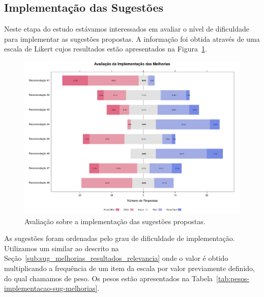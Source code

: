 \subsection{Implementação das Sugestões}
\label{sub:sug_melhorias_resultados_implementacao}

Neste etapa do estudo estávamos interessados em avaliar o nível de dificuldade
para implementar as sugestões propostas. A informação foi obtida através de uma
escala de Likert cujos resultados estão apresentados na
Figura~\ref{fig:plot_likert_avaliacao_implementacao_melhorias}.

\begin{figure}[htpb]
    \centering
    \includegraphics[width=1.1\linewidth]{chapter-sugestoes-melhorias-fgrm/img/plot_likert_avaliacao_implementacao_melhorias.pdf}
    \caption{Avaliação sobre a  implementação das sugestões propostas.}
\label{fig:plot_likert_avaliacao_implementacao_melhorias}
\end{figure}

As sugestões foram ordenadas pelo grau de dificuldade de implementação.
Utilizamos um similar ao descrito na
Seção~\ref{sub:sug_melhorias_resultados_relevancia} onde o valor é obtido
multiplicando a frequência de um item da escala por valor previamente definido,
do qual chamamos de peso. Os pesos estão apresentados na
Tabela~\ref{tab:pesos-implementacao-sug-melhorias}.

\begin{table}[htpb]
\centering
{}
\caption{Pesos utilizados no ranqueamento das sugestões de melhorias}
\label{tab:pesos-implementacao-sug-melhorias}
\end{table}

